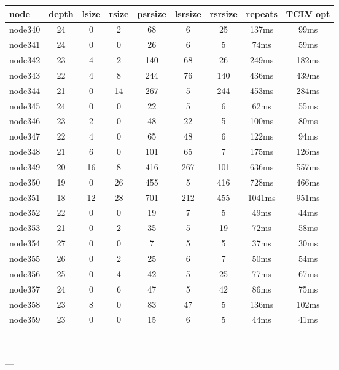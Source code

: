 \begin{tabular}{|l|c|c|c|c|c|c|c|c|}
\hline node & depth & lsize & rsize & psrsize & lsrsize & rsrsize   & repeats & TCLV opt\\
    \hline node340 & 24 & 0 & 2 & 68 & 6 & 25 & 137ms & 99ms\\
    \hline node341 & 24 & 0 & 0 & 26 & 6 & 5 & 74ms & 59ms\\
    \hline node342 & 23 & 4 & 2 & 140 & 68 & 26 & 249ms & 182ms\\
    \hline node343 & 22 & 4 & 8 & 244 & 76 & 140 & 436ms & 439ms\\
    \hline node344 & 21 & 0 & 14 & 267 & 5 & 244 & 453ms & 284ms\\
    \hline node345 & 24 & 0 & 0 & 22 & 5 & 6 & 62ms & 55ms\\
    \hline node346 & 23 & 2 & 0 & 48 & 22 & 5 & 100ms & 80ms\\
    \hline node347 & 22 & 4 & 0 & 65 & 48 & 6 & 122ms & 94ms\\
    \hline node348 & 21 & 6 & 0 & 101 & 65 & 7 & 175ms & 126ms\\
    \hline node349 & 20 & 16 & 8 & 416 & 267 & 101 & 636ms & 557ms\\
    \hline node350 & 19 & 0 & 26 & 455 & 5 & 416 & 728ms & 466ms\\
    \hline node351 & 18 & 12 & 28 & 701 & 212 & 455 & 1041ms & 951ms\\
    \hline node352 & 22 & 0 & 0 & 19 & 7 & 5 & 49ms & 44ms\\
    \hline node353 & 21 & 0 & 2 & 35 & 5 & 19 & 72ms & 58ms\\
    \hline node354 & 27 & 0 & 0 & 7 & 5 & 5 & 37ms & 30ms\\
    \hline node355 & 26 & 0 & 2 & 25 & 6 & 7 & 50ms & 54ms\\
    \hline node356 & 25 & 0 & 4 & 42 & 5 & 25 & 77ms & 67ms\\
    \hline node357 & 24 & 0 & 6 & 47 & 5 & 42 & 86ms & 75ms\\
    \hline node358 & 23 & 8 & 0 & 83 & 47 & 5 & 136ms & 102ms\\
    \hline node359 & 23 & 0 & 0 & 15 & 6 & 5 & 44ms & 41ms\\

\hline
\end{tabular} \

---


